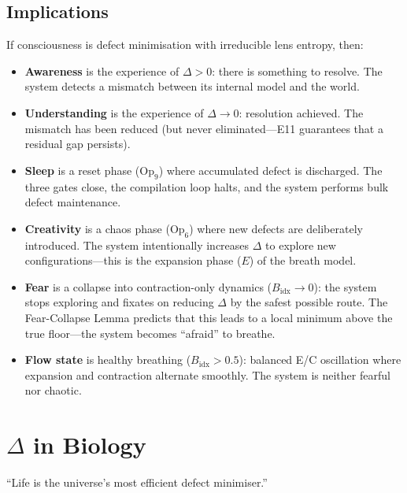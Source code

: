 \documentclass[12pt, openany]{book}
\theoremstyle{remark}
\begin{document}
\section{Implications}
\label{sec:consciousness-implications}

If consciousness is defect minimisation with irreducible lens entropy, then:
\begin{itemize}
  \item \textbf{Awareness} is the experience of $\Delta > 0$: there is something
        to resolve.  The system detects a mismatch between its internal model
        and the world.
  \item \textbf{Understanding} is the experience of $\Delta \to 0$: resolution
        achieved.  The mismatch has been reduced (but never eliminated---E11
        guarantees that a residual gap persists).
  \item \textbf{Sleep} is a reset phase ($\mathrm{Op}_9$) where accumulated defect
        is discharged.  The three gates close, the compilation loop halts, and
        the system performs bulk defect maintenance.
  \item \textbf{Creativity} is a chaos phase ($\mathrm{Op}_6$) where new defects
        are deliberately introduced.  The system intentionally increases $\Delta$
        to explore new configurations---this is the expansion phase ($E$) of
        the breath model.
  \item \textbf{Fear} is a collapse into contraction-only dynamics
        ($B_{\mathrm{idx}} \to 0$): the system stops exploring and fixates on
        reducing $\Delta$ by the safest possible route.  The Fear-Collapse Lemma
        predicts that this leads to a local minimum above the true floor---the
        system becomes ``afraid'' to breathe.
  \item \textbf{Flow state} is healthy breathing ($B_{\mathrm{idx}} > 0.5$):
        balanced E/C oscillation where expansion and contraction alternate
        smoothly.  The system is neither fearful nor chaotic.
\end{itemize}


\chapter{$\Delta$ in Biology}
\label{ch:biology}

\epigraph{``Life is the universe's most efficient defect minimiser.''}{}
\end{document}
